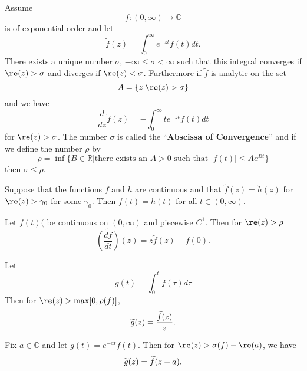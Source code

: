 \begin{thm}%
Assume
\begin{equation}%
f:(0,\infty)\to\mathbb{C}
\end{equation}
is of exponential order and let
\begin{equation}%
\widetilde{f}(z) = \int^{\infty}_{0}e^{-zt}f(t)dt.
\end{equation}
There exists a unique number $\sigma$, $-\infty\leq\sigma<\infty$
such that this integral converges if $\re(z)>\sigma$ and diverges
if $\re(z)<\sigma$. Furthermore if $\widetilde{f}$ is analytic on
the set
\begin{equation}%
A = \{z|\re(z)>\sigma\}
\end{equation}
and we have
\begin{equation}%
\frac{d}{dz}\widetilde{f}(z) = -\int^{\infty}_{0}te^{-zt}f(t)dt
\end{equation}
for $\re(z)>\sigma$. The number $\sigma$ is called the
``\textbf{Abscissa of Convergence}'' and if we define the number
$\rho$ by 
\begin{equation}%
\rho=\inf\{B\in\mathbb{R}|\text{there exists an }A>0\text{ such
  that }|f(t)|\leq Ae^{Bt}\}
\end{equation}
then $\sigma\leq\rho$.
\end{thm}
\begin{thm}
Suppose that the functions $f$ and $h$ are continuous and that
$\widetilde{f}(z)=\widetilde{h}(z)$ for $\re(z)>\gamma_0$ for
some $\gamma_0$. Then $f(t)=h(t)$ for all $t\in(0,\infty)$.
\end{thm}
\begin{prop}%
Let $f(t)($ be continuous on $(0,\infty)$ and piecewise
$C^1$. Then for $\re(z)>\rho$
\begin{equation}%
\widetilde{\left(\frac{df}{dt}\right)}(z)=z\widetilde{f}(z)-f(0).
\end{equation}
\end{prop}
\begin{prop}%
Let
\begin{equation}%
g(t)=\int^{t}_{0}f(\tau)d\tau
\end{equation}
Then for $\re(z)>\max[0,\rho(f)]$,
\begin{equation}%
\wt{g}(z) = \frac{\wt{f}(z)}{z}.
\end{equation}
\end{prop}
\begin{thm}%
Fix $a\in\mathbb{C}$ and let $g(t)=e^{-at}f(t)$. Then for
$\re(z)>\sigma(f)-\re(a)$, we have
\begin{equation}%
\wt{g}(z)=\wt{f}(z+a).
\end{equation}
\end{thm}

